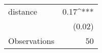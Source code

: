 \begin{tabular}{@{\extracolsep{5pt}}lD{.}{.}{-2} } 
\toprule
 distance & 0.17^{***} \\ 
  & (0.02) \\ 
\midrule
Observations & 50 \\
\bottomrule
 \end{tabular} 
